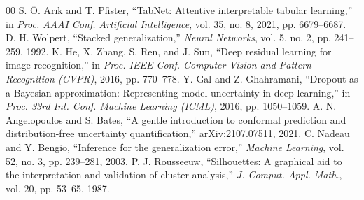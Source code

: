 \documentclass[conference]{IEEEtran}
\begin{document}
\begin{thebibliography}{00}
 S. \"{O}. Ar{\i}k and T. Pfister, ``TabNet: Attentive interpretable tabular learning,'' in \emph{Proc. AAAI Conf. Artificial Intelligence}, vol. 35, no. 8, 2021, pp. 6679--6687.
 D. H. Wolpert, ``Stacked generalization,'' \emph{Neural Networks}, vol. 5, no. 2, pp. 241--259, 1992.
 K. He, X. Zhang, S. Ren, and J. Sun, ``Deep residual learning for image recognition,'' in \emph{Proc. IEEE Conf. Computer Vision and Pattern Recognition (CVPR)}, 2016, pp. 770--778.
 Y. Gal and Z. Ghahramani, ``Dropout as a Bayesian approximation: Representing model uncertainty in deep learning,'' in \emph{Proc. 33rd Int. Conf. Machine Learning (ICML)}, 2016, pp. 1050--1059.
 A. N. Angelopoulos and S. Bates, ``A gentle introduction to conformal prediction and distribution-free uncertainty quantification,'' arXiv:2107.07511, 2021.
 C. Nadeau and Y. Bengio, ``Inference for the generalization error,'' \emph{Machine Learning}, vol. 52, no. 3, pp. 239--281, 2003.
 P. J. Rousseeuw, ``Silhouettes: A graphical aid to the interpretation and validation of cluster analysis,'' \emph{J. Comput. Appl. Math.}, vol. 20, pp. 53--65, 1987.
\end{thebibliography}
\end{document}
